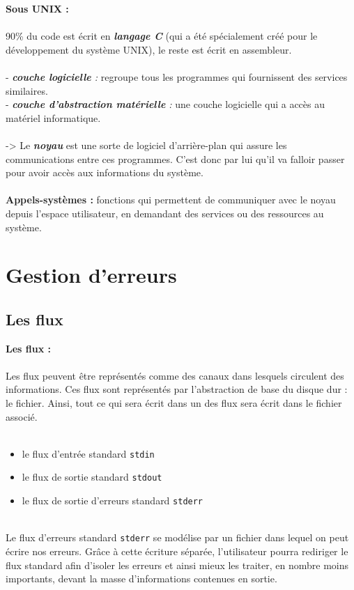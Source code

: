 		\begin{frame}
			\textbf{Sous UNIX :}
			\\~\\
			90\% du code est écrit en \textit{\textbf{langage C}} (qui a été spécialement créé pour le développement du système UNIX), le reste est écrit en assembleur.
			\\~\\
			- \textit{\textbf{couche logicielle} : } regroupe tous les programmes qui fournissent des services similaires.\\ 
			- \textit{\textbf{couche d'abstraction matérielle} : } une couche logicielle qui a accès au matériel informatique.
			\\~\\
			-> Le \textit{\textbf{noyau}} est une sorte de logiciel d'arrière-plan qui assure les communications entre ces programmes. C'est donc par lui qu'il va falloir passer pour avoir accès aux informations du système.
			\\~\\
			\textbf{Appels-systèmes :} fonctions qui permettent de communiquer avec le noyau depuis l’espace utilisateur, en demandant des services ou des ressources au système.
		\end{frame}		
		
	\section{Gestion d'erreurs}
	\subsection{Les flux}
		\begin{frame}
			\textbf{Les flux :}
			\\~\\
			Les flux peuvent être représentés comme des canaux dans lesquels circulent des informations. Ces flux sont représentés par l'abstraction de base du disque dur : le fichier. Ainsi, tout ce qui sera écrit dans un des flux sera écrit dans le fichier associé.
			\\~\\
			\begin{itemize}
				\item le flux d'entrée standard \lstinline!stdin!
				\item le flux de sortie standard \lstinline!stdout!
				\item le flux de sortie d'erreurs standard \lstinline!stderr!
			\end{itemize}
			~\\
			Le flux d'erreurs standard \lstinline!stderr! se modélise par un fichier dans lequel on peut écrire nos erreurs. Grâce à cette écriture séparée, l'utilisateur pourra rediriger le flux standard afin d'isoler les erreurs et ainsi mieux les traiter, en nombre moins importants, devant la masse d'informations contenues en sortie. 
		\end{frame}
	
